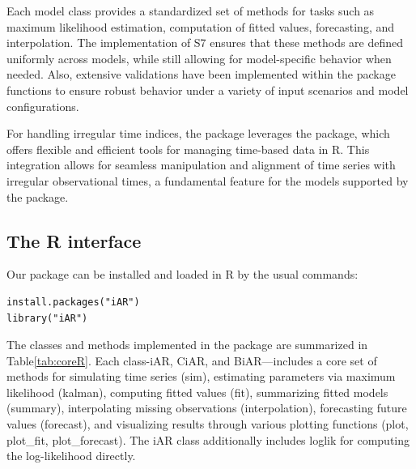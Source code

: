 Each model class provides a standardized set of methods for tasks such as maximum likelihood estimation, computation of fitted values, forecasting, and interpolation. The implementation of S7 ensures that these methods are defined uniformly across models, while still allowing for model-specific behavior when needed. Also, extensive validations have been implemented within the package functions to ensure robust behavior under a variety of input scenarios and model configurations.

For handling irregular time indices, the package leverages the  package, which offers flexible and efficient tools for managing time-based data in R. This integration allows for seamless manipulation and alignment of time series with irregular observational times, a fundamental feature for the models supported by the package.

\subsection{The R interface}\label{the-r-interface}

Our package can be installed and loaded in R by the usual commands:

\begin{verbatim}
install.packages("iAR")
library("iAR")
\end{verbatim}

The classes and methods implemented in the  package are summarized in Table\ref{tab:coreR}. Each class-iAR, CiAR, and BiAR---includes a core set of methods for simulating time series (sim), estimating parameters via maximum likelihood (kalman), computing fitted values (fit), summarizing fitted models (summary), interpolating missing observations (interpolation), forecasting future values (forecast), and visualizing results through various plotting functions (plot, plot\_fit, plot\_forecast). The iAR class additionally includes loglik for computing the log-likelihood directly.

